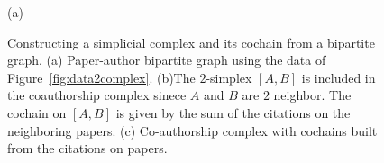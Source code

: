 \begin{figure}[htpb]
%
\settowidth{\tempwidth}{\usebox{\tempbox}}%
\hfil\begin{minipage}[b]{\tempwidth}%
\raisebox{-\height}{\usebox{\tempbox}}%
\scriptsize{\caption*{(a)}}%
\end{minipage}%
%
\settowidth{\tempwidth}{\usebox{\tempbox}}%
\hfil\begin{minipage}[b]{\tempwidth}%
\raisebox{-\height}{\usebox{\tempbox}}%
\scriptsize{}%
\end{minipage}%
\vspace{5pt}
\settowidth{\tempwidth}{\usebox{\tempbox}}%
\hfil\begin{minipage}[b]{\tempwidth}%
\raisebox{-\height}{\usebox{\tempbox}}%
\scriptsize{}%
\end{minipage}%
\caption{Constructing a simplicial complex and its cochain from a bipartite graph. (a) Paper-author bipartite graph using the data of Figure~\ref{fig:data2complex}. (b)The $2$-simplex $[A,B]$ is included in the coauthorship complex sinece $A$ and $B$ are $2$ neighbor. The cochain on $[A,B]$ is given by the sum of the citations on the neighboring papers. (c) Co-authorship complex with cochains built from the citations on papers.}\label{fig:bipartite}
\end{figure}



